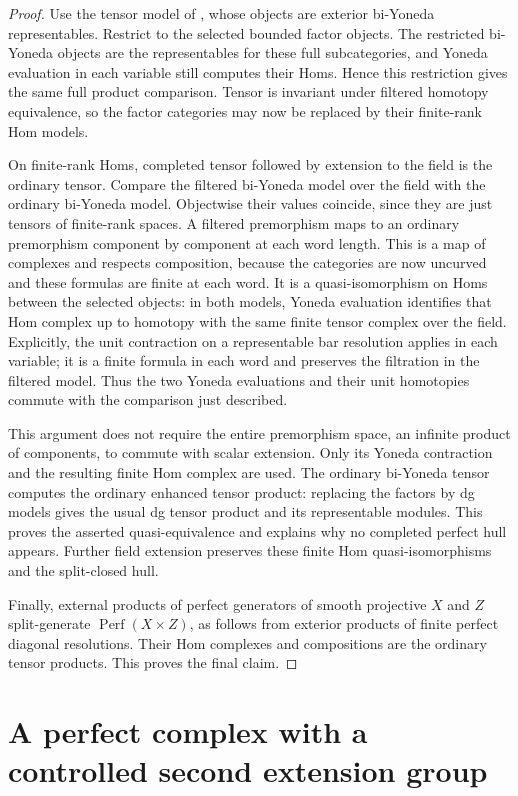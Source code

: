 \documentclass[11pt]{article}
\numberwithin{equation}{section}
\theoremstyle{definition}
\theoremstyle{remark}
\newcommand{\Perf}{\operatorname{Perf}}
\begin{document}
\begin{proof}
Use the tensor model of \cite[Section~16.1]{Floer:Fukaya},
whose objects are exterior bi-Yoneda representables.  Restrict
to the selected bounded factor objects.  The restricted
bi-Yoneda objects are the representables for these full
subcategories, and Yoneda evaluation in each variable still
computes their Homs.  Hence this restriction gives the same
full product comparison.  Tensor is invariant under filtered
homotopy equivalence, so the factor categories may now be
replaced by their finite-rank Hom models.

On finite-rank Homs, completed tensor followed by extension
to the field is the ordinary tensor.  Compare the filtered
bi-Yoneda model over the field with the ordinary bi-Yoneda
model.  Objectwise their values coincide, since they are
just tensors of finite-rank spaces.  A filtered premorphism
maps to an ordinary premorphism component by component at
each word length.  This is a map of complexes and respects
composition, because the categories are now uncurved and
these formulas are finite at each word.  It is a
quasi-isomorphism on Homs between the selected objects:
in both models, Yoneda evaluation identifies that Hom
complex up to homotopy with the same finite tensor complex
over the field.  Explicitly, the unit contraction on a
representable bar resolution applies in each variable;
it is a finite formula in each word and preserves the
filtration in the filtered model.  Thus the two Yoneda
evaluations and their unit homotopies commute with the
comparison just described.

This argument does not require the entire premorphism space,
an infinite product of components, to commute with scalar
extension.  Only its Yoneda contraction and the resulting
finite Hom complex are used.  The ordinary bi-Yoneda tensor
computes the ordinary enhanced tensor product: replacing
the factors by dg models gives the usual dg tensor product
and its representable modules.  This proves the asserted
quasi-equivalence and explains why no completed perfect
hull appears.  Further field extension preserves these
finite Hom quasi-isomorphisms and the split-closed hull.

Finally, external products of perfect generators of smooth
projective $X$ and $Z$ split-generate $\Perf(X\times Z)$,
as follows from exterior products of finite perfect
diagonal resolutions.  Their Hom complexes and compositions
are the ordinary tensor products.  This proves the final
claim.
\end{proof}


\section{A perfect complex with a controlled second extension group}
\label{sec:perfect}
\end{document}
